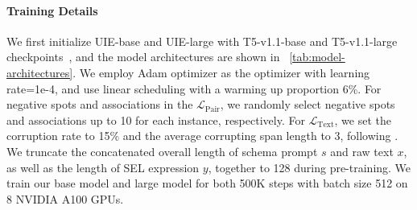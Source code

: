 \documentclass[11pt]{article}
\begin{document}
\begin{table}[t]
  \centering
  \caption{
    Detailed datasets statistics.
    |*| indicates the number of categories, and \# is the number of sentences in the specific subset.
    We take sentiment types as special relation type: positive, negative, and neutral; and each sentiment triplet holds a aspect and a opinion.
}
  \label{tab:details_datasets}
\end{table} 
\paragraph{Training Details}

We first initialize UIE-base and UIE-large with T5-v1.1-base and T5-v1.1-large checkpoints~\citep{2020t5}, and the model architectures are shown in \tablename~\ref{tab:model-architectures}.
We employ Adam optimizer \cite{Kingma2015adam} as the optimizer with learning rate=1e-4, and use linear scheduling with a warming up proportion 6\%.
For negative spots and associations in the $\mathcal{L}_{\text{Pair}}$, we randomly select negative spots and associations up to 10 for each instance, respectively.
For $\mathcal{L}_{\text{Text}}$, we set the corruption rate to 15\% and the average corrupting span length to 3, following \citet{2020t5}.
We truncate the concatenated overall length of schema prompt $s$ and raw text $x$, as well as the length of SEL expression $y$, together to 128 during pre-training.
We train our base model and large model for both 500K steps with batch size 512 on 8 NVIDIA A100 GPUs.
\end{document}
